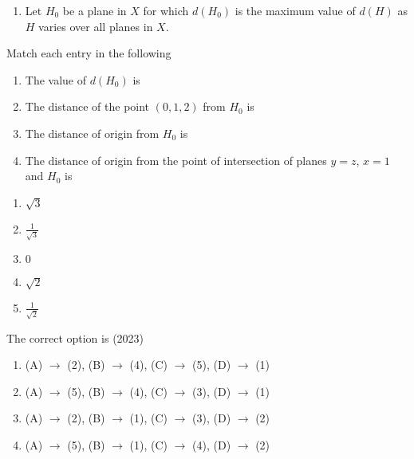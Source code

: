 \begin{enumerate}[label=\thesubsection.\arabic*.,ref=\thesubsection.\theenumi]
\begin{enumerate}
 \item Let $H_0$ be a plane in $X$ for which $d(H_0)$ is the maximum value of $d(H)$ as $H$ varies over all planes in $X$.
\end{enumerate}
Match each entry in the following
\begin{multicols}{2}
\begin{enumerate}[label=(\Alph*)]
     \item The value of $d(H_0)$ is
     \item The distance of the point $(0,1,2)$ from $H_0$ is
     \item The distance of origin from $H_0$ is
     \item The distance of origin from the point of intersection of planes $y=z$, $x=1$ and $H_0$ is
\end{enumerate}
%
\columnbreak
\begin{enumerate}[label=(\arabic*)]
     \item $\sqrt{3}$
     \item $\frac{1}{\sqrt{3}}$
     \item $0$
     \item $\sqrt{2}$
     \item $\frac{1}{\sqrt{2}}$
\end{enumerate}
\end{multicols}
The correct option is
\hfill (2023)
\begin{enumerate}
     \item (A) $\rightarrow$ (2), (B) $\rightarrow$ (4), (C) $\rightarrow$ (5), (D) $\rightarrow$ (1)
     \item (A) $\rightarrow$ (5), (B) $\rightarrow$ (4), (C) $\rightarrow$ (3), (D) $\rightarrow$ (1)
     \item (A) $\rightarrow$ (2), (B) $\rightarrow$ (1), (C) $\rightarrow$ (3), (D) $\rightarrow$ (2)
     \item (A) $\rightarrow$ (5), (B) $\rightarrow$ (1), (C) $\rightarrow$ (4), (D) $\rightarrow$ (2)
\end{enumerate} 

\end{enumerate}
